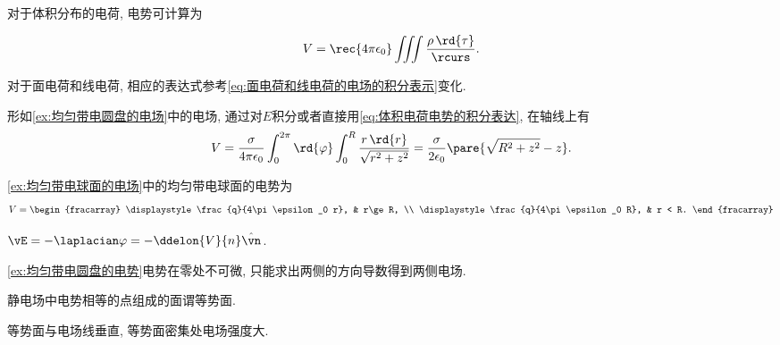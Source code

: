 \documentclass[../Electromagnetism.tex]{subfiles}
\begin{document}
\begin{corollary}[电势的显式表达]
	对于体积分布的电荷, 电势可计算为
	\begin{finale}
		\begin{equation}
			\label{eq:体积电荷电势的积分表达}
			V = \rec{4\pi\epsilon_0} \iiint\frac{\rho\,\rd{\tau}}{\rcurs}.
		\end{equation}
	\end{finale}
	对于面电荷和线电荷, 相应的表达式参考\eqref{eq:面电荷和线电荷的电场的积分表示}变化.
\end{corollary}
\begin{ex}
	\label{ex:均匀带电圆盘的电势}
	形如\cref{ex:均匀带电圆盘的电场}中的电场, 通过对$E$积分或者直接用\eqref{eq:体积电荷电势的积分表达}, 在轴线上有
	\[ V = \frac{\sigma}{4\pi\epsilon_0}\int_0^{2\pi}\rd{\varphi}\int_0^R \frac{r\,\rd{r}}{\sqrt{r^2+z^2}} = \frac{\sigma}{2\epsilon_0}\pare{\sqrt{R^2+z^2}-z}. \]
\end{ex}
\begin{ex}
	\label{ex:均匀带电球面的电势}
	\cref{ex:均匀带电球面的电场}中的均匀带电球面的电势为
	\[  
		V = 
		\begin{fracarray}
			\displaystyle
			\frac{q}{4\pi\epsilon_0 r}, & r\ge R, \\
			\displaystyle
			\frac{q}{4\pi\epsilon_0 R}, & r < R.
		\end{fracarray}
	 \]
\end{ex}
\begin{finale}
	\begin{corollary}[静电电场与电势]
		$\vE = -\laplacian \varphi = -\ddelon{V}{n}\hat{\vn}$.
	\end{corollary}
\end{finale}
\begin{pitfall}
	\cref{ex:均匀带电圆盘的电势}电势在零处不可微, 只能求出两侧的方向导数得到两侧电场.
\end{pitfall}
\begin{definition}[等势面]
	静电场中电势相等的点组成的面谓等势面.
\end{definition}
\begin{corollary}[等势面与电场]
	等势面与电场线垂直, 等势面密集处电场强度大.
\end{corollary}




\end{document}
